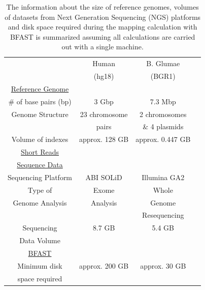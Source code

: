 \documentclass{acm_proc_article-sp}
\begin{document}
\begin{table}
\small
\begin{tabular}{|c|c|c|c|} 
  \hline 
   & Human & B. Glumae   \\ 
& (hg18) & (BGR1)\\   
   
   \hline \hline
 \underline{Reference Genome} & &  \\
    \# of base pairs (bp) &  3 Gbp & 7.3 Mbp \\ \hline
   Genome Structure &   23 chromosome  & 2 chromosomes  \\  
   &   pairs & \& 4 plasmids \\ \hline
    Volume of indexes  & approx. 128 GB  & approx. 0.447 GB  \\ 
      \hline \hline
    \underline{Short Reads} & &   \\
        \underline{Sequence Data}& &    \\
          Sequencing Platform & ABI SOLiD  &  Illumina GA2 \\ \hline
  Type of  &  Exome  & Whole \\ 
  
Genome Analysis  & Analysis &  Genome \\
&& Resequencing \\  \hline

  Sequencing   & 8.7 GB & 5.4 GB \\
  Data Volume&&\\
  
  
  \hline  \hline
  \underline{BFAST} & &  \\
  Minimum disk &  approx. 200 GB   &    approx. 30 GB   \\
space required & &\\
\hline  \hline
\end{tabular} \caption{The information about the size of reference genomes, volumes of datasets from
 Next Generation Sequencing (NGS) platforms and disk space required during the mapping calculation 
 with BFAST is summarized assuming all calculations are carried out with a single machine.}
 \label{table:two-genomes} 
\end{table}

\end{document}

